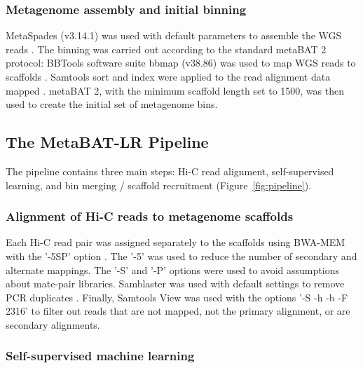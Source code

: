 \documentclass[fleqn,10pt,lineno]{wlpeerj}
\begin{document}
\subsubsection*{Metagenome assembly and initial binning}

MetaSpades (v3.14.1) was used with default parameters to assemble the WGS reads \citep{nurk2017metaspades}. The binning was carried out according to the standard metaBAT 2 protocol: BBTools software suite bbmap (v38.86) was used to map WGS reads to scaffolds \citep{bushnell2014bbmap}. Samtools sort and index were applied to the read alignment data mapped \citep{li2009sequence}. metaBAT 2, with the minimum scaffold length set to 1500, was then used to create the initial set of metagenome bins.

\subsection*{The MetaBAT-LR Pipeline}

The pipeline contains three main steps: Hi-C read alignment, self-supervised learning, and bin merging / scaffold recruitment (Figure~\ref{fig:pipeline}).

\subsubsection*{Alignment of Hi-C reads to metagenome scaffolds} 

Each Hi-C read pair was assigned separately to the scaffolds using BWA-MEM with the '-5SP' option \citep{li2013aligning}. The '-5' was used to reduce the number of secondary and alternate mappings. The '-S' and '-P' options were used to avoid assumptions about mate-pair libraries. Samblaster was used with default settings to remove PCR duplicates \citep{faust2014samblaster}. Finally, Samtools View was used with the options '-S -h -b -F 2316' to filter out reads that are not mapped, not the primary alignment, or are secondary alignments.  

\subsubsection*{Self-supervised machine learning}
\end{document}
